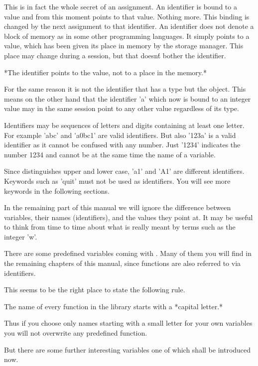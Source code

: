 This is  in  fact the whole  secret  of an assignment.  An  identifier is
bound  to a value and from  this moment  points  to that value.   Nothing
more.  This binding is changed by the next assignment to that identifier.
An  identifier  does  not  denote  a  block of  memory as  in some  other
programming languages.  It simply points to a value, which has been given
its place in memory by the {\GAP} storage manager.  This place may change
during a {\GAP} session, but that doesn\'t bother the identifier.

*The identifier points to the value, not to a place in the memory.*

For the same  reason  it  is  not the identifier that has a  type but the
object.   This means on  the other hand that the identifier 'a' which now
is bound to an  integer value may in the  same session point to any other
value regardless of its type.

Identifiers  may be sequences  of letters and digits containing at  least
one letter.   For example  'abc' and 'a0bc1'  are valid identifiers.  But
also '123a'  is  a valid identifier as  it cannot be  confused  with  any
number.  Just '1234' indicates the  number 1234 and cannot be at the same
time the name of a variable.

Since  {\GAP} distinguishes  upper and  lower  case, 'a1'  and  'A1'  are
different  identifiers.   Keywords  such as 'quit'  must not  be used  as
identifiers.  You will see more keywords in the following sections.

In  the remaining part of  this manual  we  will  ignore  the  difference
between  variables, their names  (identifiers), and the values they point
at.  It  may  be  useful to think from time to time about  what is really
meant by terms such as the integer 'w'.

There are some predefined variables coming with {\GAP}.  Many of them you
will find in the remaining  chapters of  this manual, since functions are
also referred to via identifiers.

This seems to be the right place to state the following rule.

The name  of every  function in the {\GAP} library starts with a *capital
letter.*

Thus  if you choose  only names starting with a small letter for your own
variables you will not overwrite any predefined function.

But there are some  further interesting  variables  one of which shall be
introduced now.

